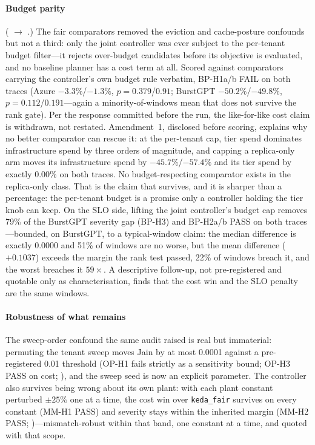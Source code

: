 \paragraph{Budget parity} ( $\to$
.) The fair comparators removed the
eviction and cache-posture confounds but not a third: only the joint
controller was ever subject to the per-tenant budget filter---it rejects
over-budget candidates before its objective is evaluated, and no baseline
planner has a cost term at all. Scored against comparators carrying the
controller's own budget rule verbatim, BP-H1a/b FAIL on both traces
(Azure $-3.3\%$/$-1.3\%$, $p = 0.379$/$0.91$; BurstGPT
$-50.2\%$/$-49.8\%$, $p = 0.112$/$0.191$---again a minority-of-windows mean
that does not survive the rank gate). Per the response committed before
the run, the like-for-like cost claim is withdrawn, not restated.
Amendment~1, disclosed before scoring, explains why no better comparator
can rescue it: at the per-tenant cap, tier spend dominates infrastructure
spend by three orders of magnitude, and capping a replica-only arm moves
its infrastructure spend by $-45.7\%$/$-57.4\%$ and its tier spend by
exactly 0.00\% on both traces. No budget-respecting comparator exists in
the replica-only class. That is the claim that survives, and it is sharper
than a percentage: the per-tenant budget is a promise only a controller
holding the tier knob can keep. On the SLO side, lifting the joint
controller's budget cap removes 79\% of the BurstGPT severity gap (BP-H3)
and BP-H2a/b PASS on both traces---bounded, on BurstGPT, to a
typical-window claim: the median difference is exactly 0.0000 and 51\% of
windows are no worse, but the mean difference ($+0.1037$) exceeds the
margin the rank test passed, 22\% of windows breach it, and the worst
breaches it $59\times$. A descriptive follow-up, not pre-registered and
quotable only as characterisation, finds that the cost win and the SLO
penalty are the same windows.

\paragraph{Robustness of what remains} The sweep-order confound the same
audit raised is real but immaterial: permuting the tenant sweep moves Jain
by at most 0.0001 against a pre-registered 0.01 threshold (OP-H1 fails
strictly as a sensitivity bound; OP-H3 PASS on cost;
), and the sweep seed is now an
explicit parameter. The controller also survives being wrong about its own
plant: with each plant constant perturbed $\pm 25\%$ one at a time, the
cost win over \texttt{keda\_fair} survives on every constant (MM-H1 PASS)
and severity stays within the inherited margin (MM-H2 PASS;
)---mismatch-robust within that band,
one constant at a time, and quoted with that scope.

